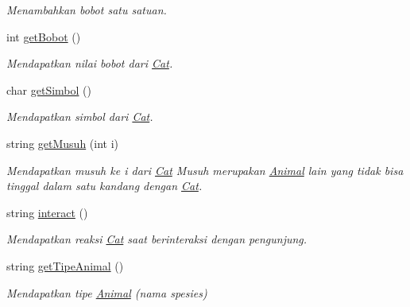 \begin{DoxyCompactItemize}
\begin{DoxyCompactList}\small\item\em Menambahkan bobot satu satuan. \end{DoxyCompactList}\item 
int \hyperlink{classCat_a6469896b2a5cf71f1059cb6160c5ab1c}{get\-Bobot} ()
\begin{DoxyCompactList}\small\item\em Mendapatkan nilai bobot dari \hyperlink{classCat}{Cat}. \end{DoxyCompactList}\item 
char \hyperlink{classCat_aa5dcbb810672c41de7419448f152b111}{get\-Simbol} ()
\begin{DoxyCompactList}\small\item\em Mendapatkan simbol dari \hyperlink{classCat}{Cat}. \end{DoxyCompactList}\item 
string \hyperlink{classCat_a385ab3b94c22ab9193d3399d56c4f8df}{get\-Musuh} (int i)
\begin{DoxyCompactList}\small\item\em Mendapatkan musuh ke i dari \hyperlink{classCat}{Cat} Musuh merupakan \hyperlink{classAnimal}{Animal} lain yang tidak bisa tinggal dalam satu kandang dengan \hyperlink{classCat}{Cat}. \end{DoxyCompactList}\item 
string \hyperlink{classCat_aea67aec6bb71b1fddbb04457a4ac8686}{interact} ()
\begin{DoxyCompactList}\small\item\em Mendapatkan reaksi \hyperlink{classCat}{Cat} saat berinteraksi dengan pengunjung. \end{DoxyCompactList}\item 
string \hyperlink{classCat_afdfbeb800c542a10a79151d2d7519ac3}{get\-Tipe\-Animal} ()
\begin{DoxyCompactList}\small\item\em Mendapatkan tipe \hyperlink{classAnimal}{Animal} (nama spesies) \end{DoxyCompactList}\end{DoxyCompactItemize}
